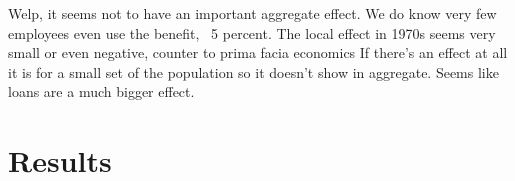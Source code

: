 \documentclass[review]{elsarticle}
\begin{document}





        Welp, it seems not to have an important aggregate effect.
        We do know very few employees even use the benefit, ~5 percent.
        The local effect in 1970s seems very small or even negative, counter to prima facia economics
        If there's an effect at all it is for a small set of the population so it doesn't show in aggregate.
        Seems like loans are a much bigger effect.

        \section{Results}
        
        
        
\end{document}
